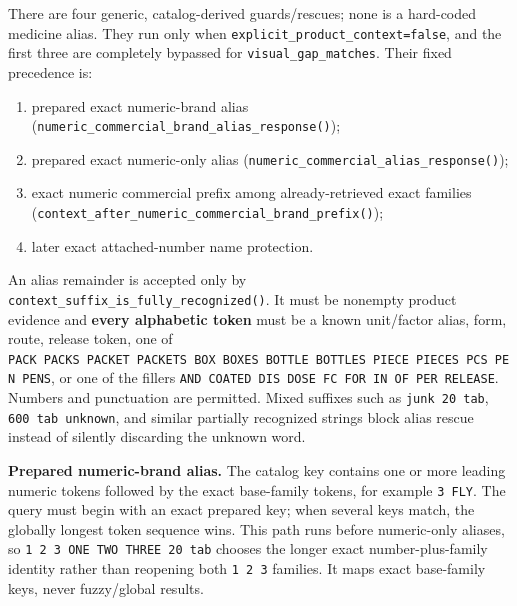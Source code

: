 There are four generic, catalog-derived guards/rescues; none is a hard-coded medicine alias. They run only when \texttt{explicit\_\allowbreak{}product\_\allowbreak{}context=false}, and the first three are completely bypassed for \texttt{visual\_\allowbreak{}gap\_\allowbreak{}matches}. Their fixed precedence is:

\begin{enumerate}
\def\labelenumi{\arabic{enumi}.}
\tightlist
\item
  prepared exact numeric-brand alias (\texttt{numeric\_\allowbreak{}commercial\_\allowbreak{}brand\_\allowbreak{}alias\_\allowbreak{}response()});
\item
  prepared exact numeric-only alias (\texttt{numeric\_\allowbreak{}commercial\_\allowbreak{}alias\_\allowbreak{}response()});
\item
  exact numeric commercial prefix among already-retrieved exact families (\texttt{context\_\allowbreak{}after\_\allowbreak{}numeric\_\allowbreak{}commercial\_\allowbreak{}brand\_\allowbreak{}prefix()});
\item
  later exact attached-number name protection.
\end{enumerate}

An alias remainder is accepted only by \texttt{context\_\allowbreak{}suffix\_\allowbreak{}is\_\allowbreak{}fully\_\allowbreak{}recognized()}. It must be nonempty product evidence and \textbf{every alphabetic token} must be a known unit/factor alias, form, route, release token, one of \texttt{PACK\ PACKS\ PACKET\ PACKETS\ BOX\ BOXES\ BOTTLE\ BOTTLES\ PIECE\ PIECES\ PCS\ PEN\ PENS}, or one of the fillers \texttt{AND\ COATED\ DIS\ DOSE\ FC\ FOR\ IN\ OF\ PER\ RELEASE}. Numbers and punctuation are permitted. Mixed suffixes such as \texttt{junk\ 20\ tab}, \texttt{600\ tab\ unknown}, and similar partially recognized strings block alias rescue instead of silently discarding the unknown word.

\textbf{Prepared numeric-brand alias.} The catalog key contains one or more leading numeric tokens followed by the exact base-family tokens, for example \texttt{3\ FLY}. The query must begin with an exact prepared key; when several keys match, the globally longest token sequence wins. This path runs before numeric-only aliases, so \texttt{1\ 2\ 3\ ONE\ TWO\ THREE\ 20\ tab} chooses the longer exact number-plus-family identity rather than reopening both \texttt{1\ 2\ 3} families. It maps exact base-family keys, never fuzzy/global results.

